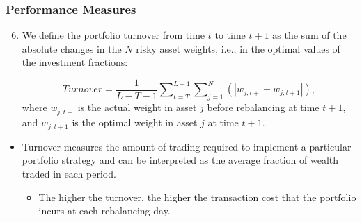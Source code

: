 \documentclass[pdf,9pt,xcolor=dvipsnames,hide notes]{beamer}
\begin{document}
\begin{frame}
	\frametitle{Performance Measures}
	
	\begin{enumerate}
		\setcounter{enumi}{5}
		
		\item We define the portfolio turnover from time $t$ to time $t+1$ as the sum of
		the absolute changes in the $N$ risky asset weights, i.e., in the optimal
		values of the investment fractions:
		
		\begin{equation}
		Turnover=\frac{1}{L-T-1}\sum\nolimits_{t=T}^{L-1}\sum\nolimits_{j=1}^{N}%
		\left( \left\vert w_{j,t+}-w_{j,t+1}\right\vert \right) ,
		\end{equation}%
		where $w_{j,t+}^{{}}$ is the actual weight in asset $j$ before rebalancing
		at time $t+1$, and $w_{j,t+1}$ is the optimal weight in asset $j$ at time $%
		t+1$. 
		
		
			\end{enumerate}
		
		\vspace{0.3cm}
		
		\begin{itemize}
		
			\item Turnover measures the amount of trading required to implement a
		particular portfolio strategy and can be interpreted as the average fraction
		of wealth traded in each period.
		\vspace{0.3cm}
		
		\begin{itemize} \item The higher the turnover, the higher
		the transaction cost that the portfolio incurs at each rebalancing day.
		\end{itemize}
		
		\end{itemize}
		
		
\end{frame}
\end{document}
